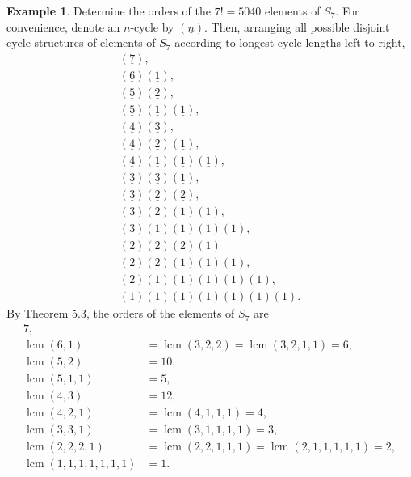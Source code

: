 \documentclass{article}
\DeclareMathOperator{\lcm}{lcm}
\theoremstyle{definition}
\newtheorem{example}{Example}[section]
\begin{document}
 \begin{example}
    Determine the orders of the $7! = 5040$ elements of $S_7$. For convenience, denote an $n$-cycle by $(\underline{n})$. Then, arranging all possible disjoint cycle structures of elements of $S_7$ according to longest cycle lengths left to right,
    \begin{align*}
        (\underline{7}), \\
        (\underline{6})(\underline{1}), \\
        (\underline{5})(\underline{2}), \\
        (\underline{5})(\underline{1})(\underline{1}), \\
        (\underline{4})(\underline{3}), \\
        (\underline{4})(\underline{2})(\underline{1}), \\
        (\underline{4})(\underline{1})(\underline{1})(\underline{1}), \\
        (\underline{3})(\underline{3})(\underline{1}), \\
        (\underline{3})(\underline{2})(\underline{2}), \\
        (\underline{3})(\underline{2})(\underline{1})(\underline{1}), \\
        (\underline{3})(\underline{1})(\underline{1})(\underline{1})(\underline{1}), \\
        (\underline{2})(\underline{2})(\underline{2})(\underline{1}) \\
        (\underline{2})(\underline{2})(\underline{1})(\underline{1})(\underline{1}), \\
        (\underline{2})(\underline{1})(\underline{1})(\underline{1})(\underline{1})(\underline{1}), \\
        (\underline{1})(\underline{1})(\underline{1})(\underline{1})(\underline{1})(\underline{1})(\underline{1}).
    \end{align*}
    By Theorem 5.3, the orders of the elements of $S_7$ are
    \begin{align*}
        7, \\
        \lcm(6,1) &= \lcm(3,2,2) = \lcm(3,2,1,1) = 6, \\
        \lcm(5,2) &= 10, \\
        \lcm(5,1,1) &= 5, \\
        \lcm(4,3) &= 12, \\
        \lcm(4,2,1) &= \lcm(4,1,1,1) = 4, \\
        \lcm(3,3,1) &= \lcm(3,1,1,1,1) = 3, \\
        \lcm(2,2,2,1) &= \lcm (2,2,1,1,1) = \lcm(2,1,1,1,1,1) = 2, \\
        \lcm(1,1,1,1,1,1,1) &= 1.
    \end{align*}
 \end{example}
 
\end{document}
